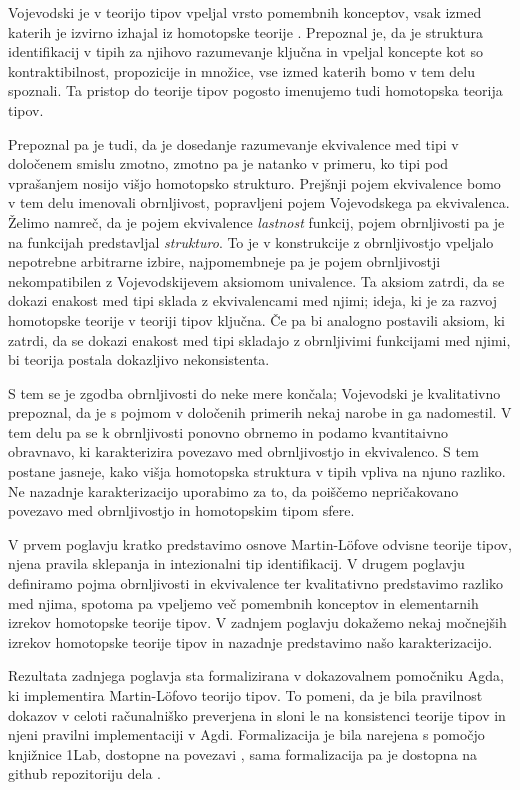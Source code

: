 Vojevodski je v teorijo tipov vpeljal vrsto pomembnih konceptov, vsak izmed katerih je izvirno izhajal iz homotopske teorije \cite{origin-of-uni-foundations}. Prepoznal je, da je struktura identifikacij v tipih za njihovo razumevanje ključna in vpeljal koncepte kot so kontraktibilnost, propozicije in množice, vse izmed katerih bomo v tem delu spoznali. Ta pristop do teorije tipov pogosto imenujemo tudi homotopska teorija tipov.

Prepoznal pa je tudi, da je dosedanje razumevanje ekvivalence med tipi v določenem smislu zmotno, zmotno pa je natanko v primeru, ko tipi pod vprašanjem nosijo višjo homotopsko strukturo. Prejšnji pojem ekvivalence bomo v tem delu imenovali obrnljivost, popravljeni pojem Vojevodskega pa ekvivalenca. Želimo namreč, da je pojem ekvivalence \emph{lastnost} funkcij, pojem obrnljivosti pa je na funkcijah predstavljal \emph{strukturo}. To je v konstrukcije z obrnljivostjo vpeljalo nepotrebne arbitrarne izbire, najpomembneje pa je pojem obrnljivostji nekompatibilen z Vojevodskijevem aksiomom univalence. Ta aksiom zatrdi, da se dokazi enakost med tipi sklada z ekvivalencami med njimi; ideja, ki je za razvoj homotopske teorije v teoriji tipov ključna. Če pa bi analogno postavili aksiom, ki zatrdi, da se dokazi enakost med tipi skladajo z obrnljivimi funkcijami med njimi, bi teorija postala dokazljivo nekonsistenta.

S tem se je zgodba obrnljivosti do neke mere končala; Vojevodski je kvalitativno prepoznal, da je s pojmom v določenih primerih nekaj narobe in ga nadomestil. V tem delu pa se k obrnljivosti ponovno obrnemo in podamo kvantitaivno obravnavo, ki karakterizira povezavo med obrnljivostjo in ekvivalenco. S tem postane jasneje, kako višja homotopska struktura v tipih vpliva na njuno razliko. Ne nazadnje karakterizacijo uporabimo za to, da poiščemo nepričakovano povezavo med obrnljivostjo in homotopskim tipom sfere.

V prvem poglavju kratko predstavimo osnove Martin-Löfove odvisne teorije tipov, njena pravila sklepanja in intezionalni tip identifikacij. V drugem poglavju definiramo pojma obrnljivosti in ekvivalence ter kvalitativno predstavimo razliko med njima, spotoma pa vpeljemo več pomembnih konceptov in elementarnih izrekov homotopske teorije tipov. V zadnjem poglavju dokažemo nekaj močnejših izrekov homotopske teorije tipov in nazadnje predstavimo našo karakterizacijo.

Rezultata zadnjega poglavja sta formalizirana v dokazovalnem pomočniku Agda, ki implementira Martin-Löfovo teorijo tipov. To pomeni, da je bila pravilnost dokazov v celoti računalniško preverjena in sloni le na konsistenci teorije tipov in njeni pravilni implementaciji v Agdi. Formalizacija je bila narejena s pomočjo knjižnice 1Lab, dostopne na povezavi \cite{1lab}, sama formalizacija pa je dostopna na github repozitoriju dela \cite{repo}.

